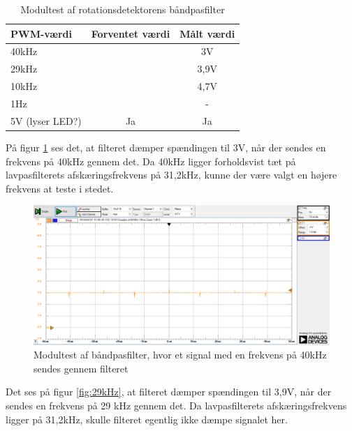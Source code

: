 \begin{table}[H]
	\centering
	\begin{tabular}{|l|c|c|}
		\hline
		\textbf{PWM-værdi} & \textbf{Forventet værdi} & \textbf{Målt værdi} \\ \hline
		40kHz              & \multicolumn{1}{l|}{}    & 3V                  \\ \hline
		29kHz              & \multicolumn{1}{l|}{}    & 3,9V                \\ \hline
		10kHz              & \multicolumn{1}{l|}{}    & 4,7V                \\ \hline
		1Hz               & \multicolumn{1}{l|}{}    & -                   \\ \hline
		5V (lyser LED?)    & Ja                       & Ja                  \\ \hline
	\end{tabular}
	\caption{Modultest af rotationsdetektorens båndpasfilter}
	\label{table:baandpasfiltertest}
\end{table}

På figur \ref{fig:40kHz} ses det, at filteret dæmper spændingen til 3V, når der sendes en frekvens på 40kHz gennem det. Da 40kHz ligger forholdsvist tæt på lavpasfilterets afskæringsfrekvens på 31,2kHz, kunne der være valgt en højere frekvens at teste i stedet. 

\begin{figure}[H]
	\centering
	\includegraphics[width=\textwidth]{Test/images/AffyringTest/BaandpasfilterTest/40kHz}
	\caption{Modultest af båndpasfilter, hvor et signal med en frekvens på 40kHz sendes gennem filteret}
	\label{fig:40kHz}
\end{figure}

Det ses på figur \ref{fig:29kHz}, at filteret dæmper spændingen til 3,9V, når der sendes en frekvens på 29 kHz gennem det. Da lavpasfilterets afskæringsfrekvens ligger på 31,2kHz, skulle filteret egentlig ikke dæmpe signalet her. 

